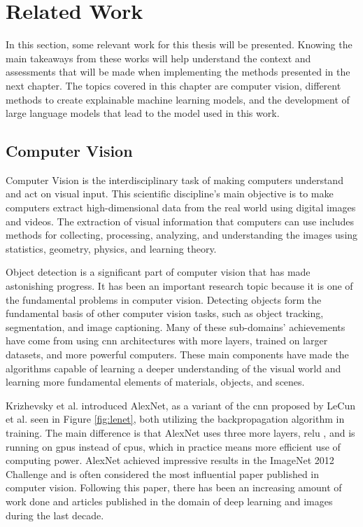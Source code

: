 \label{sec:2_related_work}
\section{Related Work} 

In this section, some relevant work for this thesis will be presented. Knowing the main takeaways from these works will help understand the context and assessments that will be made when implementing the methods presented in the next chapter. 
The topics covered in this chapter are computer vision, different methods to create explainable machine learning models, and the development of large language models that lead to the model used in this work.

\subsection{Computer Vision}
Computer Vision is the interdisciplinary task of making computers understand and act on visual input. This scientific discipline's main objective is to make computers extract high-dimensional data from the real world using digital images and videos. The extraction of visual information that computers can use includes methods for collecting, processing, analyzing, and understanding the images using statistics, geometry, physics, and learning theory. 

Object detection is a significant part of computer vision that has made astonishing progress. It has been an important research topic because it is one of the fundamental problems in computer vision. Detecting objects form the fundamental basis of other computer vision tasks, such as object tracking, segmentation, and image captioning. Many of these sub-domains' achievements have come from using \gls{cnn} architectures with more layers, trained on larger datasets, and more powerful computers. These main components have made the algorithms capable of learning a deeper understanding of the visual world and learning more fundamental elements of materials, objects, and scenes.  

Krizhevsky et al. introduced AlexNet\cite{krizhevskyImageNetClassificationDeep2017}, as a variant of the \gls{cnn} proposed by LeCun et al.\cite{lecunHandwrittenDigitRecognition1989, lecunGradientbasedLearningApplied1998} seen in Figure \ref{fig:lenet}, both utilizing the backpropagation algorithm \cite{rumelhartLearningRepresentationsBackpropagating1986}
in training. The main difference is that AlexNet uses three more layers, \gls{relu} \cite{fukushimaCognitronSelforganizingMultilayered1975}
, and is running on \glspl{gpu} instead of \glspl{cpu}, which in practice means more efficient use of computing power.
AlexNet achieved impressive results in the ImageNet \cite{dengImageNetLargeScaleHierarchical2009} 2012 Challenge and is often considered the most influential paper published in computer vision. 
Following this paper, there has been an increasing amount of work done and articles published in the domain of deep learning and images during the last decade.


